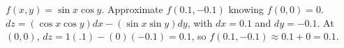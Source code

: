 {$f(x,y) = \sin x\cos y$. Approximate $f(0.1,-0.1)$ knowing $f(0,0) = 0$. 
}
{$dz = (\cos x\cos y)dx - (\sin x\sin y)dy$, with $dx = 0.1$ and $dy = -0.1$. At $(0,0)$, $dz = 1(.1) - (0)(-0.1) = 0.1$, so $f(0.1,-0.1) \approx 0.1+0 = 0.1$.
}